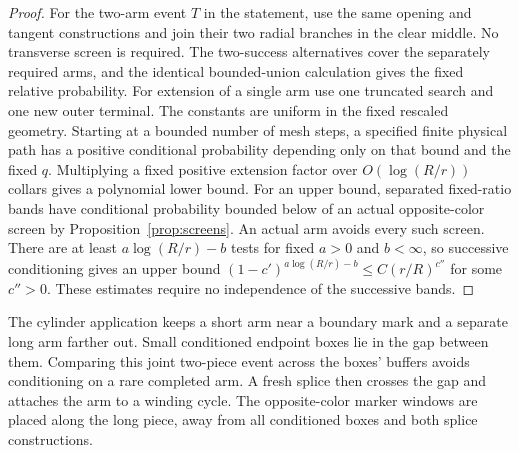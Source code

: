 \begin{proof}
For the two-arm event $T$ in the statement, use the same
opening and tangent constructions and join their two radial
branches in the clear middle. No transverse screen is required.
The two-success alternatives cover the separately required arms,
and the identical bounded-union calculation gives the fixed
relative probability. For extension of a single arm use one
truncated search and one new outer terminal. The constants are
uniform in the fixed rescaled geometry. Starting at a bounded
number of mesh steps, a specified finite physical path has a
positive conditional probability depending only on that bound
and the fixed $q$. Multiplying a fixed positive extension factor
over $O(\log(R/r))$ collars gives a polynomial lower bound.
For an upper bound, separated fixed-ratio bands have conditional
probability bounded below of an actual opposite-color screen by
Proposition~\ref{prop:screens}. An actual arm avoids every such
screen. There are at least $a\log(R/r)-b$ tests for fixed $a>0$ and
$b<\infty$, so successive conditioning gives an upper bound
$(1-c')^{a\log(R/r)-b}\le C(r/R)^{c''}$ for some $c''>0$.
These estimates require no independence
of the successive bands.
\end{proof}

The cylinder application keeps a short arm near a boundary mark and
a separate long arm farther out. Small conditioned endpoint boxes
lie in the gap between them. Comparing this joint two-piece event
across the boxes' buffers avoids conditioning on a rare completed
arm. A fresh splice then crosses the gap and attaches the arm to a
winding cycle. The opposite-color marker windows are placed along
the long piece, away from all conditioned boxes and both splice
constructions.

